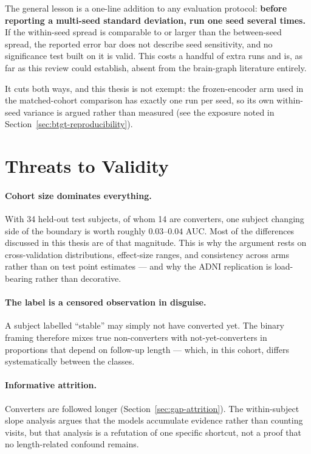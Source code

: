 The general lesson is a one-line addition to any evaluation protocol: \textbf{before
reporting a multi-seed standard deviation, run one seed several times.} If the within-seed
spread is comparable to or larger than the between-seed spread, the reported error bar does
not describe seed sensitivity, and no significance test built on it is valid. This costs a
handful of extra runs and is, as far as this review could establish, absent from the
brain-graph literature entirely.

It cuts both ways, and this thesis is not exempt: the frozen-encoder arm used in the
matched-cohort comparison has exactly one run per seed, so its own within-seed variance is
argued rather than measured (see the exposure noted in
Section~\ref{sec:btgt-reproducibility}).

\section{Threats to Validity}
\label{sec:disc-threats}

\paragraph{Cohort size dominates everything.} With 34 held-out test subjects, of whom 14 are
converters, one subject changing side of the boundary is worth roughly $0.03$--$0.04$ AUC.
Most of the differences discussed in this thesis are of that magnitude. This is why the
argument rests on cross-validation distributions, effect-size ranges, and consistency across
arms rather than on test point estimates --- and why the ADNI replication is load-bearing
rather than decorative.

\paragraph{The label is a censored observation in disguise.} A subject labelled ``stable''
may simply not have converted yet. The binary framing therefore mixes true non-converters
with not-yet-converters in proportions that depend on follow-up length --- which, in this
cohort, differs systematically between the classes.

\paragraph{Informative attrition.} Converters are followed longer
(Section~\ref{sec:gap-attrition}). The within-subject slope analysis argues that the models
accumulate evidence rather than counting visits, but that analysis is a refutation of one
specific shortcut, not a proof that no length-related confound remains.


